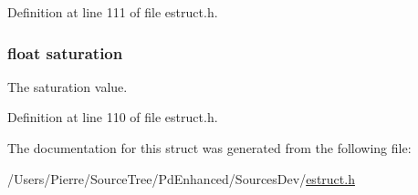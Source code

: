 Definition at line 111 of file estruct.\-h.

\hypertarget{struct__hsl_a953351912fb6da22fde59fe0f24909e7}{
\subsubsection[{saturation}]{\setlength{\rightskip}{0pt plus 5cm}float saturation}}\label{struct__hsl_a953351912fb6da22fde59fe0f24909e7}
The saturation value. 

Definition at line 110 of file estruct.\-h.



The documentation for this struct was generated from the following file\-:\begin{DoxyCompactItemize}
\item 
/\-Users/\-Pierre/\-Source\-Tree/\-Pd\-Enhanced/\-Sources\-Dev/\hyperlink{estruct_8h}{estruct.\-h}\end{DoxyCompactItemize}
